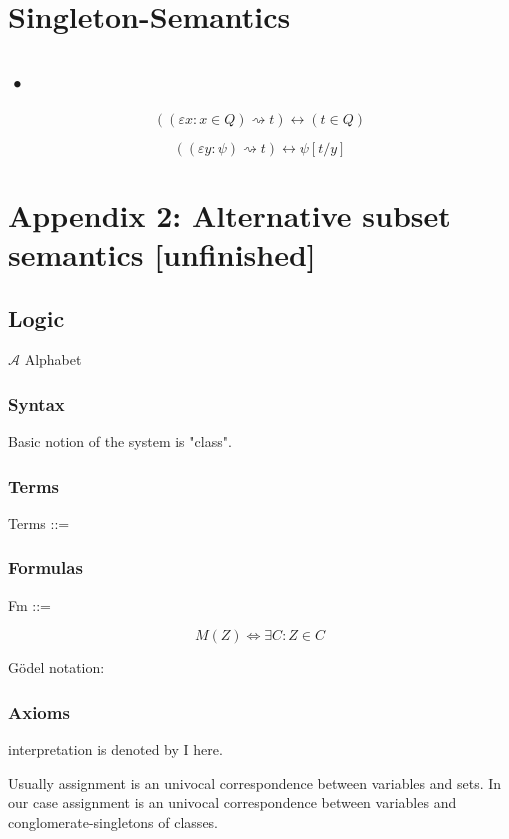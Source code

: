\def\topic{Alternative semantics}



\section{Singleton-Semantics}
\subsection{•}
\[((\varepsilon x:x\in Q)\rightsquigarrow t) \longleftrightarrow (t\in Q)\]

\[((\varepsilon y:\psi)\rightsquigarrow t) \longleftrightarrow \psi[t/y]\]


\section{Appendix 2: Alternative subset semantics [unfinished]}
\subsection{Logic}
$\mathcal{A}$ Alphabet
\subsubsection{Syntax}
Basic notion of the system is "class".
\subsubsection{Terms}
Terms ::= \\

\subsubsection{Formulas}
\begin{definition}
Fm ::=\\
\end{definition}

\begin{definition}
\[M(Z) \iff \exists C: Z\in C\]
\end{definition}

G\"odel notation:\\

\subsubsection{Axioms}
interpretation is denoted by I here.

Usually assignment is an univocal correspondence between variables and sets.
In our case assignment is an univocal correspondence between variables and conglomerate-singletons of classes.\\

